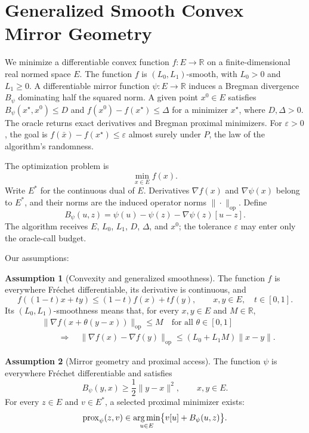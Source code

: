\documentclass[10pt]{article}
\theoremstyle{definition}
\newtheorem{assumption}{Assumption}
\begin{document}
\section*{Generalized Smooth Convex Mirror Geometry}
We minimize a differentiable convex function $f:E\to\mathbb{R}$ on a finite-dimensional real normed space $E$. The function $f$ is $(L_0,L_1)$-smooth, with $L_0>0$ and $L_1\geq0$. A differentiable mirror function $\psi:E\to\mathbb{R}$ induces a Bregman divergence $B_\psi$ dominating half the squared norm. A given point $x^0\in E$ satisfies $B_\psi(x^\star,x^0)\leq D$ and $f(x^0)-f(x^\star)\leq\Delta$ for a minimizer $x^\star$, where $D,\Delta>0$. The oracle returns exact derivatives and Bregman proximal minimizers. For $\varepsilon>0$, the goal is $f(\bar{x})-f(x^\star)\leq\varepsilon$ almost surely under $P$, the law of the algorithm's randomness.

The optimization problem is
\[
\min_{x\in E} f(x).
\]
Write $E^*$ for the continuous dual of $E$. Derivatives $\nabla f(x)$ and $\nabla\psi(x)$ belong to $E^*$, and their norms are the induced operator norms $\|\cdot\|_{\mathrm{op}}$. Define
\[
B_\psi(u,z)=\psi(u)-\psi(z)-\nabla\psi(z)[u-z].
\]
The algorithm receives $E$, $L_0$, $L_1$, $D$, $\Delta$, and $x^0$; the tolerance $\varepsilon$ may enter only the oracle-call budget.

Our assumptions:
\begin{assumption}[Convexity and generalized smoothness]
The function $f$ is everywhere Fr\'echet differentiable, its derivative is continuous, and
\[
f((1-t)x+ty)\leq(1-t)f(x)+tf(y),
\qquad x,y\in E,\quad t\in[0,1].
\]
Its $(L_0,L_1)$-smoothness means that, for every $x,y\in E$ and $M\in\mathbb{R}$,
\[
\begin{aligned}
&\|\nabla f(x+\theta(y-x))\|_{\mathrm{op}}\leq M
\quad\text{for all }\theta\in[0,1]\\
&\qquad\Longrightarrow\quad
\|\nabla f(x)-\nabla f(y)\|_{\mathrm{op}}
\leq (L_0+L_1M)\|x-y\|.
\end{aligned}
\]
\end{assumption}

\begin{assumption}[Mirror geometry and proximal access]
The function $\psi$ is everywhere Fr\'echet differentiable and satisfies
\[
B_\psi(y,x)\geq\frac12\|y-x\|^2,
\qquad x,y\in E.
\]
For every $z\in E$ and $v\in E^*$, a selected proximal minimizer exists:
\[
\operatorname{prox}_\psi(z,v)\in
\mathop{\rm arg\,min}_{u\in E}
\bigl\{v[u]+B_\psi(u,z)\bigr\}.
\]
\end{assumption}
\end{document}
